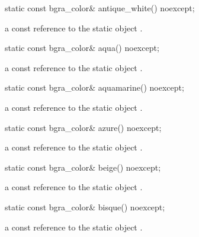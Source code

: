 \begin{itemdecl}
static const bgra_color& antique_white() noexcept;
\end{itemdecl}
\begin{itemdescr}
\pnum
\returns
a const reference to the static  object .
\end{itemdescr}

\begin{itemdecl}
static const bgra_color& aqua() noexcept;
\end{itemdecl}
\begin{itemdescr}
\pnum
\returns
a const reference to the static  object .
\end{itemdescr}

\begin{itemdecl}
static const bgra_color& aquamarine() noexcept;
\end{itemdecl}
\begin{itemdescr}
\pnum
\returns
a const reference to the static  object .
\end{itemdescr}

\begin{itemdecl}
static const bgra_color& azure() noexcept;
\end{itemdecl}
\begin{itemdescr}
\pnum
\returns
a const reference to the static  object .
\end{itemdescr}

\begin{itemdecl}
static const bgra_color& beige() noexcept;
\end{itemdecl}
\begin{itemdescr}
\pnum
\returns
a const reference to the static  object .
\end{itemdescr}

\begin{itemdecl}
static const bgra_color& bisque() noexcept;
\end{itemdecl}
\begin{itemdescr}
\pnum
\returns
a const reference to the static  object .
\end{itemdescr}

